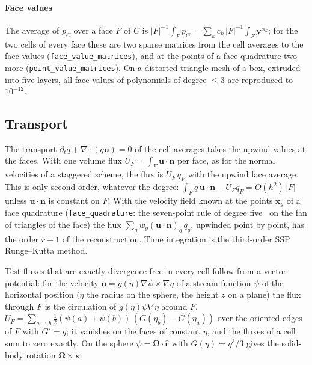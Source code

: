 \documentclass[preprint,12pt]{elsarticle}
\newcommand{\bn}{\mathbf{n}}
\newcommand{\bx}{\mathbf{x}}
\newcommand{\by}{\mathbf{y}}
\newcommand{\bu}{\mathbf{u}}
\newcommand{\code}[1]{\texttt{#1}}
\theoremstyle{definition}
\begin{document}
\paragraph{Face values} The average of $p_C$ over a face $F$ of $C$ is
$|F|^{-1}\int_F p_C = \sum_k c_k\, |F|^{-1}\int_F\by^{\alpha_k}$; for the two cells of every face
these are two sparse matrices from the cell averages to the face values (\code{face\_value\_matrices}),
and at the points of a face quadrature two more (\code{point\_value\_matrices}). On a distorted
triangle mesh of a box, extruded into five layers, all face values of polynomials of degree $\le3$ are
reproduced to $10^{-12}$.

\subsection{Transport}
The transport $\partial_t q+\nabla\cdot(q\bu)=0$ of the cell averages takes the upwind values at the
faces. With one volume flux $U_F=\int_F\bu\cdot\bn$ per face, as for the normal velocities of a
staggered scheme, the flux is $U_F\,\bar q_F$ with the upwind face average. This is only second order,
whatever the degree: $\int_F q\,\bu\cdot\bn - U_F\bar q_F = O(h^2)\,|F|$ unless $\bu\cdot\bn$ is
constant on $F$. With the velocity field known at the points $\bx_g$ of a face quadrature
(\code{face\_quadrature}: the seven-point rule of degree five~\cite{Dunavant1985} on the fan of triangles
of the face) the flux $\sum_g w_g(\bu\cdot\bn)_g\,q_g$, upwinded point by point, has the order $r+1$ of
the reconstruction. Time integration is the third-order SSP Runge--Kutta method.

Test fluxes that are exactly divergence free in every cell follow from a vector potential: for the
velocity $\bu = g(\eta)\nabla\psi\times\nabla\eta$ of a stream function $\psi$ of the horizontal position
($\eta$ the radius on the sphere, the height $z$ on a plane) the flux through $F$ is the circulation of
$g(\eta)\psi\nabla\eta$ around $F$, $U_F = \sum_{a\to b}\frac12(\psi(a)+\psi(b))\,(G(\eta_b)-G(\eta_a))$
over the oriented edges of $F$ with $G'=g$; it vanishes on the faces of constant $\eta$, and the fluxes
of a cell sum to zero exactly. On the sphere $\psi=\boldsymbol\Omega\cdot\hat{\mathbf r}$ with
$G(\eta)=\eta^3/3$ gives the solid-body rotation $\boldsymbol\Omega\times\bx$.
\end{document}
